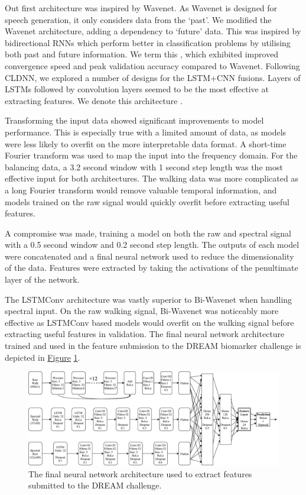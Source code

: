 \documentclass[12pt, twoside]{book}
\renewcommand\emph[1]{\textit{\color{USred}{#1}}}
\begin{document}
Out first architecture was inspired by Wavenet. As Wavenet is designed for speech generation, it only considers data from the `past'. We modified the Wavenet architecture, adding a dependency to `future' data. This was inspired by bidirectional RNNs which perform better in classification problems by utilising both past and future information. We term this \emph{Bi-Wavenet}, which exhibited improved convergence speed and peak validation accuracy compared to Wavenet. Following CLDNN, we explored a number of designs for the LSTM+CNN fusions. Layers of LSTMs followed by convolution layers seemed to be the most effective at extracting features. We denote this architecture \emph{LSTMConv}. 


Transforming the input data showed significant improvements to model performance. This is especially true with a limited amount of data, as models were less likely to overfit on the more interpretable data format. A short-time Fourier transform was used to map the input into the frequency domain. For the balancing data, a 3.2 second window with 1 second step length was the most effective input for both architectures. The walking data was more complicated as a long Fourier transform would remove valuable temporal information, and models trained on the raw signal would quickly overfit before extracting useful features. 

A compromise was made, training a model on both the raw and spectral signal with a 0.5 second window and 0.2 second step length. The outputs of each model were concatenated and a final neural network used to reduce the dimensionality of the data. Features were extracted by taking the activations of the penultimate layer of the network.


The LSTMConv architecture was vastly superior to Bi-Wavenet when handling spectral input. On the raw walking signal, Bi-Wavenet was noticeably more effective as LSTMConv based models would overfit on the walking signal before extracting useful features in validation. The final neural network architecture trained and used in the feature submission to the DREAM biomarker challenge is depicted in \hyperref[finalarchitecture]{Figure} \ref{finalarchitecture}.


\begin{figure}[!htb]
	\centering\centerline{\includegraphics[width=1.2\linewidth]{final_architecture.pdf}}
	\caption{The final neural network architecture used to extract features submitted to the DREAM challenge.}
	\label{finalarchitecture}
\end{figure}
\end{document}

